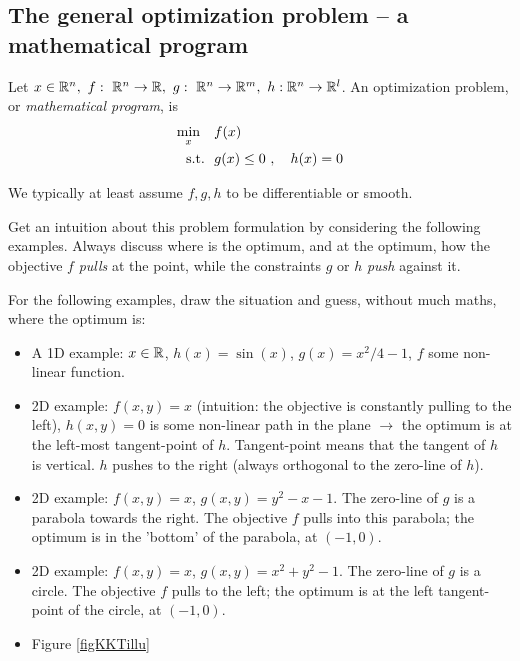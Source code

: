 \subsection{The general optimization problem -- a mathematical program}

\begin{myDefinition}
Let $x\in{\mathbb{R}}^n,~ f:~ {\mathbb{R}}^n \to {\mathbb{R}},~ g:~ {\mathbb{R}}^n \to {\mathbb{R}}^m,~
h: {\mathbb{R}}^n\to{\mathbb{R}}^l$. An optimization problem, or \emph{mathematical
program}, is
\begin{align*}
\min_x\quad & f(x)\\
~~\text{s.t.}~~ & g(x)\le 0~,\quad h(x)=0
\end{align*}
\end{myDefinition}
We typically at least assume $f,g,h$ to be differentiable or smooth.

Get an intuition about this problem formulation by considering the
following examples. Always discuss where is the optimum, and at the
optimum, how the objective $f$ \emph{pulls} at the point, while the
constraints $g$ or $h$ \emph{push} against it.

For the following examples, draw the situation and guess, without much maths, where the optimum is:
\begin{itemize}
\item A 1D example: $x\in{\mathbb{R}}$, $h(x) = \sin(x)$, $g(x) = x^2/4-1$,
$f$ some non-linear function.

\item 2D example: $f(x,y) = x$ (intuition: the objective is constantly
pulling to the left), $h(x,y)=0$ is some non-linear path in the plane
$\to$ the optimum is at the left-most tangent-point of
$h$. Tangent-point means that the tangent of $h$ is vertical. $h$
pushes to the right (always orthogonal to the zero-line of $h$).

\item 2D example: $f(x,y) = x$, $g(x,y) = y^2-x-1$. The zero-line of
$g$ is a parabola towards the right. The objective $f$ pulls into this
parabola; the optimum is in the 'bottom' of the parabola, at $(-1,0)$.

\item 2D example: $f(x,y) = x$, $g(x,y) = x^2 + y^2-1$. The zero-line of
$g$ is a circle. The objective $f$ pulls to the left; the optimum is
at the left tangent-point of the circle, at $(-1,0)$.

\item Figure \ref{figKKTillu}
\end{itemize}

